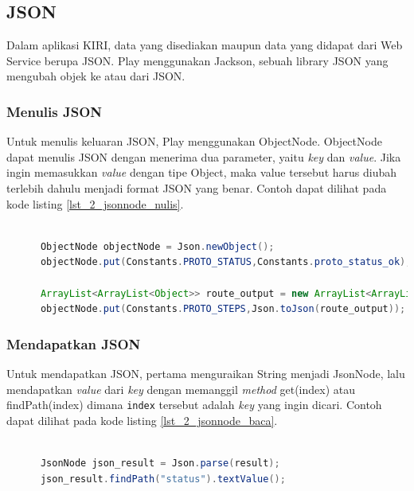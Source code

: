 \subsection{JSON}
Dalam aplikasi KIRI, data yang disediakan maupun data yang didapat dari Web Service berupa JSON. Play menggunakan Jackson, sebuah library JSON yang mengubah objek ke atau dari JSON.

\subsubsection{Menulis JSON}
Untuk menulis keluaran JSON, Play menggunakan ObjectNode. ObjectNode dapat menulis JSON dengan menerima dua parameter, yaitu \textit{key} dan \textit{value}. Jika ingin memasukkan \textit{value} dengan tipe Object, maka value tersebut harus diubah terlebih dahulu menjadi format JSON yang benar. Contoh dapat dilihat pada kode listing \ref{lst_2_jsonnode_nulis}.

\begin{lstlisting}[caption=Contoh menulis JSON menggunakan ObjectNode,label = {lst_2_jsonnode_nulis},language=Java]
	
      ObjectNode objectNode = Json.newObject();
      objectNode.put(Constants.PROTO_STATUS,Constants.proto_status_ok);
      
      ArrayList<ArrayList<Object>> route_output = new ArrayList<ArrayList<Object>>();
      objectNode.put(Constants.PROTO_STEPS,Json.toJson(route_output));
\end{lstlisting}

\subsubsection{Mendapatkan JSON}
Untuk mendapatkan JSON, pertama menguraikan String menjadi JsonNode, lalu mendapatkan \textit{value} dari \textit{key} dengan memanggil \textit{method} get(index) atau findPath(index) dimana \verb!index! tersebut adalah \textit{key} yang ingin dicari. Contoh dapat dilihat pada kode listing \ref{lst_2_jsonnode_baca}.

\begin{lstlisting}[caption=Contoh mendapatkan JSON menggunakan JsonNode,label = {lst_2_jsonnode_baca},language=Java]
	
      JsonNode json_result = Json.parse(result);
      json_result.findPath("status").textValue();
\end{lstlisting} 

